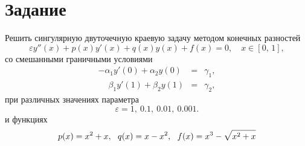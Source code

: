 \documentclass[a4paper,12pt]{extarticle}
\begin{document}
    \setcounter{page}{2}
    \tableofcontents
    \vspace{\baselineskip}
   
    
    \newpage
    \section{Задание}
     Решить сингулярную двуточечную краевую задачу методом конечных разностей
    $$
    \varepsilon y''(x) + p(x)y'(x) + q(x)y(x) + f(x) = 0,\quad x\in[0,\,1],
    $$
    со смешанными граничными условиями
    $$
    \begin{array}{rcl}
    -\alpha_1y'(0) + \alpha_2y(0)			&=&	\gamma_1,\\[8pt]
    \phantom{-}\beta_1y'(1) + \beta_2y(1)	&=&	\gamma_2,
    \end{array}
    $$
    при различных значениях параметра 
    $$
    \varepsilon=1,~0.1,~0.01,~0.001.
    $$
    и функциях
    $$
    p(x)=x^{2}+x,~~~\\[8pt]
    q(x)=x-x^{2},~~~\\[8pt]
    f(x)=x^{3}-\sqrt{x^{2}+x}
    $$
    
\end{document}
